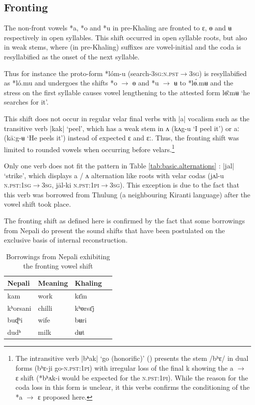 \documentclass[oldfontcommands,oneside,a4paper,11pt]{article}
\newcommand{\ipa}[1]{{\phon \mbox{#1}}} %
\begin{document}
\subsection{Fronting} \label{sec:fronting}
The non-front vowels \ipa{*a}, \ipa{*o} and \ipa{*u} in pre-Khaling are fronted to \ipa{ɛ}, \ipa{ɵ} and \ipa{ʉ} respectively in open syllables. This shift occurred in   open syllable roots, but also in weak stems, where (in pre-Khaling) suffixes are vowel-initial and the coda is resyllabified as the onset of the next syllable. 

Thus for instance  the proto-form \ipa{*lóm-u} (search-\textsc{3sg:n.pst$\rightarrow$3sg}) is resyllabified as \ipa{*ló.mu} and undergoes the shifts \ipa{*o} $\rightarrow$ \ipa{ɵ} and \ipa{*u} $\rightarrow$ \ipa{ʉ} to  \ipa{*lɵ́.mʉ} and the stress on the first syllable causes vowel lengthening to the attested form \ipa{lɵ̄ːmʉ} `he searches for it'.

This shift does not occur in regular velar final verbs with |a| vocalism such as the transitive verb |kak| `peel', which has a weak stem in \ipa{ʌ} (\ipa{kʌg-u} `I peel it') or \ipa{aː}  (\ipa{kāːg-ʉ} `He peels it') instead of expected \ipa{ɛ} and \ipa{ɛː}.  Thus, the fronting shift was limited to rounded vowels when occurring before velars.\footnote{The intransitive   verb |\ipa{bʰak}| `go (honorific)' (\citealt[1115]{jacques12khaling}) presents the stem  /\ipa{bʰɛ}/ in dual forms (\ipa{bʰɛ-ji} go-\textsc{n.pst:1pi}) with irregular loss of  the final \ipa{k} showing the \ipa{a} $\rightarrow$ \ipa{ɛ} shift (\ipa{*bʰʌk-i} would be expected for the \textsc{n.pst:1pi}). While the reason for the coda loss in this form is unclear, it this verbs confirms the conditioning of the \ipa{*a} $\rightarrow$ \ipa{ɛ} proposed here.}

 Only one verb  does not fit the pattern in Table \ref{tab:basic.alternations} :  |\ipa{jal}|  `strike', which displays \ipa{a} / \ipa{ʌ} alternation like roots with velar codas (\ipa{jʌl-u} \textsc{n.pst:1sg$\rightarrow$3sg}, \ipa{ja‍̄l-ki} \textsc{n.pst:1pi$\rightarrow$3sg}). This exception is due to the fact that this verb was borrowed from Thulung (a neighbouring Kiranti language) after the vowel shift took place.

The fronting shift as defined here is confirmed   by the fact that some borrowings from Nepali do present the sound shifts that have been postulated on the exclusive basis of internal reconstruction.

\begin{table}
\caption{Borrowings from Nepali exhibiting the fronting vowel shift} \label{tab:nep.fronting} \centering
\begin{tabular}{llll}
\toprule
Nepali & Meaning & Khaling \\
\midrule
\ipa{kam} & work & \ipa{kɛ̄m} \\
\ipa{kʰorsani} & chilli&\ipa{kʰɵrsɛ̄j}\\
\ipa{buɖʰi} & wife&\ipa{bʉri}\\
\ipa{dudʰ} & milk&\ipa{dʉt}\\
\bottomrule
\end{tabular}
\end{table}
\end{document}

